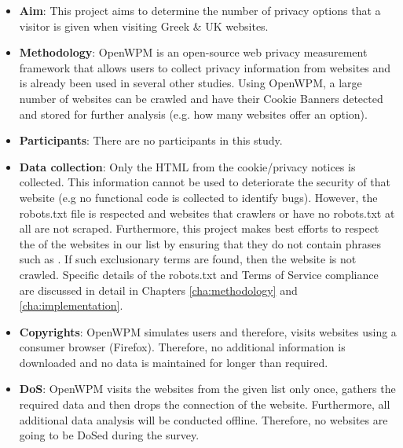 \documentclass[../main.tex]{subfiles}
\begin{document}
\begin{itemize}
    \setlength\itemsep{1em}

    \item \textbf{Aim}: This project aims to determine the number of privacy options that a visitor is given when visiting Greek \& UK websites. 

    \item \textbf{Methodology}: OpenWPM is an open-source web privacy measurement framework that allows users to collect privacy information from websites and is already been used in several other studies. Using OpenWPM, a large number of websites can be crawled and have their Cookie Banners detected and stored for further analysis (e.g. how many websites offer an  option).

    \item \textbf{Participants}: There are no participants in this study.

    \item \textbf{Data collection}: Only the HTML from the cookie/privacy notices is collected. This information cannot be used to deteriorate the security of that website (e.g no functional code is collected to identify bugs). However, the robots.txt file is respected and websites that  crawlers or have no robots.txt at all are not scraped. Furthermore, this project makes best efforts to respect the  of the websites in our list by ensuring that they do not contain phrases such as . If such exclusionary terms are found, then the website is not crawled. Specific details of the robots.txt and Terms of Service compliance are discussed in detail in Chapters \ref{cha:methodology} and \ref{cha:implementation}.

    \item \textbf{Copyrights}: OpenWPM simulates  users and therefore, visits websites using a consumer browser (Firefox). Therefore, no additional information is downloaded and no data is maintained for longer than required.

    \item \textbf{DoS}: OpenWPM visits the websites from the given list only once, gathers the required data and then drops the connection of the website. Furthermore, all additional data analysis will be conducted offline. Therefore, no websites are going to be DoSed during the survey.
\end{itemize}
\end{document}
